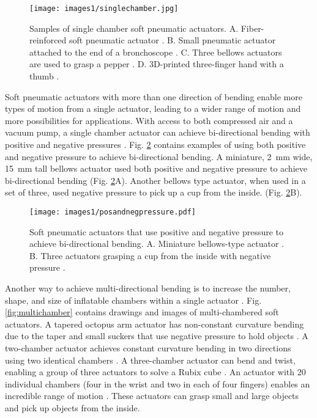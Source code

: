 \begin{figure}[!ht]
    \centering
    \texttt{[image: images1/singlechamber.jpg]}
    \caption{Samples of single chamber soft pneumatic actuators. A. Fiber-reinforced soft pneumatic actuator \cite{galloway_mechanically_2013}. B. Small pneumatic actuator attached to the end of a bronchoscope \cite{mccandless_soft_2022}. C. Three bellows actuators are used to grasp a pepper \cite{alici_modeling_2018}. D. 3D-printed three-finger hand with a thumb \cite{sundaram_dragonclaw_2023}.}
    \label{fig:singlechamber}
\end{figure}

Soft pneumatic actuators with more than one direction of bending enable more types of motion from a single actuator, leading to a wider range of motion and more possibilities for applications. With access to both compressed air and a vacuum pump, a single chamber actuator can achieve bi-directional bending with positive and negative pressures \cite{wakimoto_miniature_2011, ariyanto_three-fingered_2019, fatahillah_novel_2020}. Fig. \ref{fig:posandnegpressure} contains examples of using both positive and negative pressure to achieve bi-directional bending. A miniature, 2~mm wide, 15~mm tall bellows actuator used both positive and negative pressure to achieve bi-directional bending (Fig. \ref{fig:posandnegpressure}A). Another bellows type actuator, when used in a set of three, used negative pressure to pick up a cup from the inside. (Fig. \ref{fig:posandnegpressure}B). \\

\begin{figure}[!ht]
    \centering
    \texttt{[image: images1/posandnegpressure.pdf]}
    \caption{Soft pneumatic actuators that use positive and negative pressure to achieve bi-directional bending. A. Miniature bellows-type actuator \cite{wakimoto_miniature_2011}. B. Three actuators grasping a cup from the inside with negative pressure \cite{ariyanto_three-fingered_2019}.}
    \label{fig:posandnegpressure}
\end{figure}

Another way to achieve multi-directional bending is to increase the number, shape, and size of inflatable chambers within a single actuator \cite{bilodeau_design_2018, pagoli_soft_2021, fei_novel_2019, cappello_exploiting_2018, pang_novel_2019}. Fig. \ref{fig:multichamber} contains drawings and images of multi-chambered soft actuators. A tapered octopus arm actuator has non-constant curvature bending due to the taper and small suckers that use negative pressure to hold objects \cite{xie_octopus_2020}. A two-chamber actuator achieves constant curvature bending in two directions using two identical chambers \cite{bilodeau_design_2018}. A three-chamber actuator can bend and twist, enabling a group of three actuators to solve a Rubix cube \cite{pagoli_soft_2021}. An actuator with 20 individual chambers (four in the wrist and two in each of four fingers) enables an incredible range of motion \cite{fei_novel_2019}. These actuators can grasp small and large objects and pick up objects from the inside. \\

